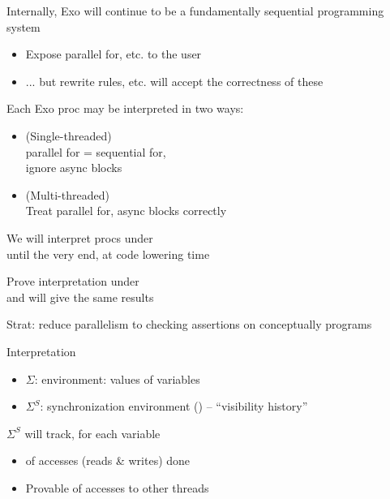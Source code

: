 \begin{minipage}[t]{0.46\textwidth}\fixminipage
Internally, Exo will continue to be a fundamentally sequential programming system
\begin{itemize}
  \item Expose parallel for, etc. to the user
  \item ... but rewrite rules, etc. will accept the correctness of these 
\end{itemize}
Each Exo proc may be interpreted in two ways:
\begin{itemize}
  \item {} (Single-threaded)\\parallel for = sequential for,\\ignore async blocks
  \item {} (Multi-threaded)\\Treat parallel for, async blocks correctly
\end{itemize}
\end{minipage}
\hfill
\begin{minipage}[t]{0.52\textwidth}\fixminipage
We will interpret procs under \\until the very end, at code lowering time

Prove interpretation under \\and {} will give the same results

Strat: reduce parallelism to checking assertions on conceptually  programs

Interpretation
\begin{itemize}
  \item $\Sigma$: environment:  values of variables
  \item $\Sigma^S$: synchronization environment () --  ``visibility history''
\end{itemize}
$\Sigma^S$ will track, for each variable
\begin{itemize}
  \item {} of accesses (reads \& writes) done
  \item Provable  of accesses to other threads
\end{itemize}

\end{minipage}
\vfill
